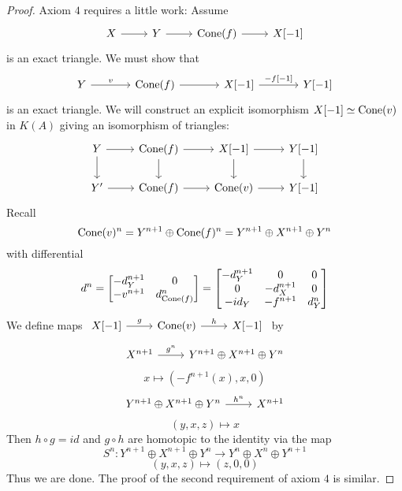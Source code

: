 \documentclass[a4paper, UKenglish]{report}
\begin{document}
\begin{proof}
    Axiom $4$ requires a little work: Assume 
    \[
        \begin{tikzcd}
            X \arrow[r] & Y \arrow[r] & \Cone(f) \arrow[r] & X[-1]
        \end{tikzcd}
    \]
    is an exact triangle. We must show that  
    \[
        \begin{tikzcd}[column sep = large]
            Y \arrow[r, "v"] & \Cone(f) \arrow[r] & X[-1] \arrow[r, "\protect{-f[-1]}"] & Y[-1]
        \end{tikzcd}
    \]
    is an exact triangle. We will construct an explicit isomorphism $X[-1] \simeq \operatorname{Cone}(v)$ in $K(A)$ giving an isomorphism of triangles:
    \[
        \begin{tikzcd}
            Y \ar{d} \ar{r} & \Cone(f) \ar{d} \ar{r} & X[-1] \arrow{d} \ar{r} & \ar{d} Y[-1] \\
            Y' \ar{r} & \Cone(f) \ar{r} & \Cone(v) \ar{r} & Y[-1] 
        \end{tikzcd}
    \]
    Recall 
    \[
		\operatorname{Cone}(v)^n = Y^{n+1} \oplus \operatorname{Cone}(f)^n = Y^{n+1} \oplus X^{n+1} \oplus Y^n
    \] 
	with differential 
    \[
        d^n 
        = 
        \begin{bmatrix} 
            -d_Y^{n+1} & 0 \\ 
            -v^{n+1}   & d_{\operatorname{Cone}(f)}^n 
        \end{bmatrix}
        =
        \begin{bmatrix} 
            -d_Y^{n+1} &  0         & 0 \\ 
            0          & -d_X^{n+1} & 0 \\ 
            -id_Y      & -f^{n+1}   & d_Y^n 
        \end{bmatrix} 
    \]
    We define maps $\begin{tikzcd} X[-1] \ar[r, "g"] & \Cone(v) \ar[r, "h"] & X[-1] \end{tikzcd}$ by
    \[ 
    	\begin{tikzcd}
            X^{n+1} \ar[r, "g^n"] & Y^{n+1} \oplus X^{n+1} \oplus Y^n 
        \end{tikzcd}
    \]
    \[ 
        x \mapsto (-f^{n+1}(x),x,0) 
    \]
    \[ 
        \begin{tikzcd}
            Y^{n+1} \oplus X^{n+1} \oplus Y^n \ar[r, "h^n"] & X^{n+1}
        \end{tikzcd}  
    \]
    \[ 
        (y,x,z) \mapsto x 
    \]
    Then $h \circ g = id$ and $g \circ h$ are homotopic to the identity via the map
    \[
        S^n \colon Y^{n+1} \oplus X^{n+1} \oplus Y^n \to Y^n \oplus X^n \oplus Y^{n+1} 
    \]
    \[ 
        (y,x,z) \mapsto (z,0,0) 
    \]
    Thus we are done. The proof of the second requirement of axiom $4$ is similar.
\end{proof}
\end{document}
